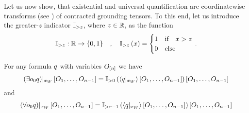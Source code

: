 Let us now show, that existential and universal quantification are coordinatewise transforms (see ) of contracted grounding tensors.
To this end, let us introduce the greater-$z$ indicator $\mathbb{I}_{>z}$, where $z\in\mathbb{R}$, as the function
\begin{align*}
    \mathbb{I}_{>z} : \mathbb{R} \rightarrow \{0,1\}
    \quad, \quad \mathbb{I}_{>z}\left(x\right) =
    \begin{cases}
        1 & \text{if}\quad x > z\\
        0 & \text{else}
    \end{cases} \, .
\end{align*}

\begin{theorem}
    For any formula $q$ with variables $O_{[n]}$ we have
    \begin{align*}
        {\left(\exists{o_{0}}q\right)}|_{x_{W}} \left[O_{1},\ldots,O_{n-1}\right] =
        {\mathbb{I}_{>0}}\left(\left\langle {q}|_{x_{W}}\right\rangle \left[ O_{1},\ldots,O_{n-1} \right]\right)\left[O_{1},\ldots,O_{n-1}\right]
    \end{align*}
    and
    \begin{align*}
        {\left(\forall{{o_{0}}} q\right)}|_{x_{W}} \left[O_{1},\ldots,O_{n-1}\right]=
        {\mathbb{I}_{>r-1}}\left(\left\langle {q}|_{x_{W}}\right\rangle \left[ O_{1},\ldots,O_{n-1} \right]\right)\left[O_{1},\ldots,O_{n-1}\right]
    \end{align*}
\end{theorem}
